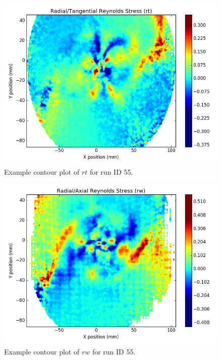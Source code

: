 \begin{figure}[H]
	\centering
	\includegraphics[width=5in]{figs/example_vortex_figs/example_rt_contour}
\caption{Example contour plot of $rt$ for run ID 55.}
\label{fig:examp_rt}
\end{figure}

\begin{figure}[H]
	\centering
	\includegraphics[width=5in]{figs/example_vortex_figs/example_rw_contour}
\caption{Example contour plot of $rw$ for run ID 55.}
\label{fig:examp_rw}
\end{figure}

